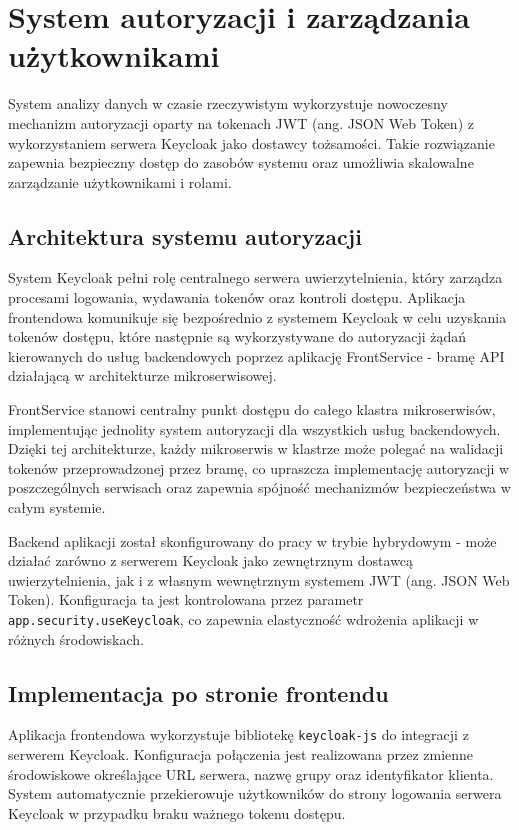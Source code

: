\section{System autoryzacji i zarządzania użytkownikami}
\label{chap:autoryzacja}

System analizy danych w czasie rzeczywistym wykorzystuje nowoczesny mechanizm autoryzacji oparty na tokenach JWT (ang. JSON Web Token) z wykorzystaniem serwera Keycloak jako dostawcy tożsamości. Takie rozwiązanie zapewnia bezpieczny dostęp do zasobów systemu oraz umożliwia skalowalne zarządzanie użytkownikami i rolami.

\subsection{Architektura systemu autoryzacji}

System Keycloak pełni rolę centralnego serwera uwierzytelnienia, który zarządza procesami logowania, wydawania tokenów oraz kontroli dostępu. Aplikacja frontendowa komunikuje się bezpośrednio z systemem Keycloak w celu uzyskania tokenów dostępu, które następnie są wykorzystywane do autoryzacji żądań kierowanych do usług backendowych poprzez aplikację FrontService - bramę API działającą w architekturze mikroserwisowej.

FrontService stanowi centralny punkt dostępu do całego klastra mikroserwisów, implementując jednolity system autoryzacji dla wszystkich usług backendowych. Dzięki tej architekturze, każdy mikroserwis w klastrze może polegać na walidacji tokenów przeprowadzonej przez bramę, co upraszcza implementację autoryzacji w poszczególnych serwisach oraz zapewnia spójność mechanizmów bezpieczeństwa w całym systemie.

Backend aplikacji został skonfigurowany do pracy w trybie hybrydowym - może działać zarówno z serwerem Keycloak jako zewnętrznym dostawcą uwierzytelnienia, jak i z własnym wewnętrznym systemem JWT (ang. JSON Web Token). Konfiguracja ta jest kontrolowana przez parametr \texttt{app.security.useKeycloak}, co zapewnia elastyczność wdrożenia aplikacji w różnych środowiskach.

\subsection{Implementacja po stronie frontendu}

Aplikacja frontendowa wykorzystuje bibliotekę \texttt{keycloak-js} do integracji z serwerem Keycloak. Konfiguracja połączenia jest realizowana przez zmienne środowiskowe określające URL serwera, nazwę grupy oraz identyfikator klienta. System automatycznie przekierowuje użytkowników do strony logowania serwera Keycloak w przypadku braku ważnego tokenu dostępu.

